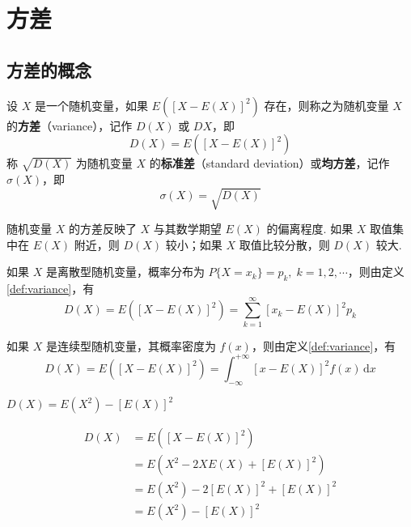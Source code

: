 \section{方差}

\subsection{方差的概念}

\begin{definition} \label{def:variance}
    设 $X$ 是一个随机变量，如果 $E([X-E(X)]^2)$ 存在，则称之为随机变量 $X$ 的\textbf{方差}（variance），记作 $D(X)$ 或 $DX$，即
    $$
    D(X) = E([X-E(X)]^2)
    $$
    称 $\sqrt{D(X)}$ 为随机变量 $X$ 的\textbf{标准差}（standard deviation）或\textbf{均方差}，记作 $\sigma(X)$，即
    $$
    \sigma(X) = \sqrt{D(X)}
    $$
\end{definition}

\vspace{-0.5em}

随机变量 $X$ 的方差反映了 $X$ 与其数学期望 $E(X)$ 的偏离程度. 如果 $X$ 取值集中在 $E(X)$ 附近，则 $D(X)$ 较小；如果 $X$ 取值比较分散，则 $D(X)$ 较大.

如果 $X$ 是离散型随机变量，概率分布为 $P\{X=x_k\} = p_k, \; k=1,2,\cdots$，则由定义\ref{def:variance}，有
$$
D(X) = E([X-E(X)]^2) = \sum_{k=1}^{\infty} [x_k - E(X)]^2 p_k
$$

如果 $X$ 是连续型随机变量，其概率密度为 $f(x)$，则由定义\ref{def:variance}，有
$$
D(X) = E([X-E(X)]^2) = \int_{-\infty}^{+\infty} [x - E(X)]^2 f(x) \, \text{d}x
$$

\begin{conclusion}[（方差的计算公式）]
    $D(X) = E(X^2) - [E(X)]^2$
\end{conclusion}

\vspace{-2em}

\begin{myproof}
    \vspace{-1.3em}
    $$
    \begin{aligned}
        D(X) &= E([X-E(X)]^2) \\
        &= E(X^2 - 2XE(X) + [E(X)]^2) \\
        &= E(X^2) - 2[E(X)]^2 + [E(X)]^2 \\
        &= E(X^2) - [E(X)]^2
    \end{aligned}
    $$

    \vspace{-1.3em}
\end{myproof}

